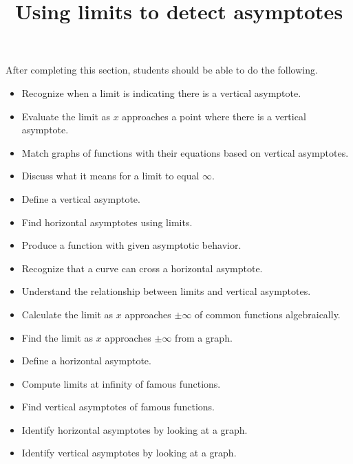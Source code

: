 \documentclass{ximera}
\title{Using limits to detect asymptotes}
\begin{document}
\begin{abstract}
\end{abstract}

\maketitle

\begin{sectionOutcomes}

After completing this section, students should be able to do the following.

\begin{itemize}
\item Recognize when a limit is indicating there is a vertical asymptote.
\item Evaluate the limit as $x$ approaches a point where there is a vertical asymptote.
\item Match graphs of functions with their equations based on vertical asymptotes.
\item Discuss what it means for a limit to equal $\infty$.
\item Define a vertical asymptote.
\item Find horizontal asymptotes using limits.
\item Produce a function with given asymptotic behavior.
\item Recognize that a curve can cross a horizontal asymptote.
\item Understand the relationship between limits and vertical asymptotes.
\item Calculate the limit as $x$ approaches $\pm \infty$ of common functions algebraically.
\item Find the limit as $x$ approaches $\pm \infty$ from a graph.
\item Define a horizontal asymptote.
\item Compute limits at infinity of famous functions.
\item Find vertical asymptotes of famous functions.
\item Identify horizontal asymptotes by looking at a graph.
\item Identify vertical asymptotes by looking at a graph.
\end{itemize}
\end{sectionOutcomes}
\end{document}
